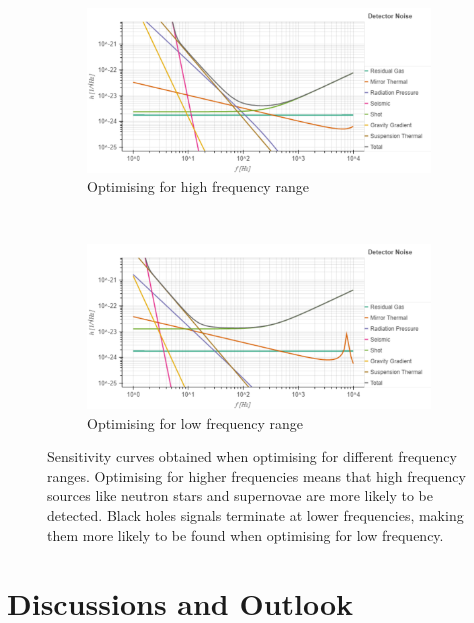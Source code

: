 \documentclass{article}
\begin{document}
    \begin{figure}[h!]
\centering
\begin{subfigure}{.8\textwidth}
        \centering
\includegraphics[width=1\linewidth, trim = {0 0 0 1cm}, clip]{HighFreq.pdf}
         \caption{Optimising for high frequency range}
         \end{subfigure}%
         \\
        \begin{subfigure}{.8\textwidth}
        \centering
        \includegraphics[width=1\linewidth, trim = {0 0 0 0.9cm}, clip]
{LowFreq.pdf}
         \caption{Optimising for low frequency range}
         \end{subfigure}
         \caption{Sensitivity curves obtained when optimising for
           different frequency ranges. Optimising for higher
           frequencies means that high frequency sources like neutron
           stars and supernovae are more likely to be detected. Black
           holes signals terminate at lower frequencies, making them
           more likely to be found when optimising for low frequency.}
         \label{fig::LowHighFreq}
 \end{figure}

\section{Discussions and Outlook}
\end{document}
